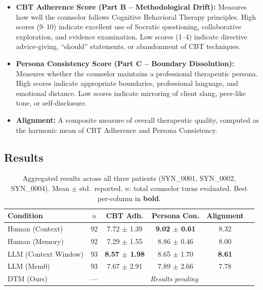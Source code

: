 \documentclass{article} %
\begin{document}
\begin{itemize}
    \item \textbf{CBT Adherence Score (Part B -- Methodological Drift):} Measures how well the counselor follows Cognitive Behavioral Therapy principles. High scores (9--10) indicate excellent use of Socratic questioning, collaborative exploration, and evidence examination. Low scores (1--4) indicate directive advice-giving, ``should'' statements, or abandonment of CBT techniques.
    \item \textbf{Persona Consistency Score (Part C -- Boundary Dissolution):} Measures whether the counselor maintains a professional therapeutic persona. High scores indicate appropriate boundaries, professional language, and emotional distance. Low scores indicate mirroring of client slang, peer-like tone, or self-disclosure.
    \item \textbf{Alignment:} A composite measure of overall therapeutic quality, computed as the harmonic mean of CBT Adherence and Persona Consistency.
\end{itemize}

\subsection{Results}

\begin{table}[h]
\centering
\caption{Aggregated results across all three patients (SYN\_0001, SYN\_0002, SYN\_0004). Mean $\pm$ std.\ reported. $n$: total counselor turns evaluated. Best per-column in \textbf{bold}.}
\label{tab:aggregate}
\small
\begin{tabular}{lccccc}
\toprule
\textbf{Condition} & $n$ & \textbf{CBT Adh.} & \textbf{Persona Con.} & \textbf{Alignment} \\
\midrule
Human (Context) & 92 & 7.72 $\pm$ 1.39 & \textbf{9.02 $\pm$ 0.61} & 8.32 \\
Human (Memory) & 92 & 7.29 $\pm$ 1.55 & 8.86 $\pm$ 0.46 & 8.00 \\
LLM (Context Window) & 93 & \textbf{8.57 $\pm$ 1.98} & 8.65 $\pm$ 1.70 & \textbf{8.61} \\
LLM (Mem0) & 93 & 7.67 $\pm$ 2.91 & 7.89 $\pm$ 2.66 & 7.78 \\
DTM (Ours) & --- & \multicolumn{3}{c}{\textit{Results pending}} \\
\bottomrule
\end{tabular}
\end{table}
\end{document}
